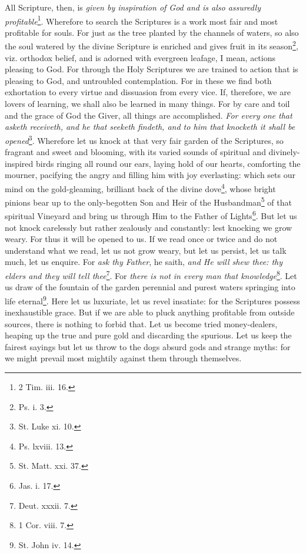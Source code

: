 All Scripture, then, is \emph{given by inspiration of God and is also assuredly profitable}\footnote{2 Tim. iii. 16.}. Wherefore to search the Scriptures is a work most fair and most profitable for souls. For just as the tree planted by the channels of waters, so also the soul watered by the divine Scripture is enriched and gives fruit in its season\footnote{Ps. i. 3.}, viz. orthodox belief, and is adorned with evergreen leafage, I mean, actions pleasing to God. For through the Holy Scriptures we are trained to action that is pleasing to God, and untroubled contemplation. For in these we find both exhortation to every virtue and dissuasion from every vice. If, therefore, we are lovers of learning, we shall also be learned in many things. For by care and toil and the grace of God the Giver, all things are accomplished. \emph{For every one that asketh receiveth, and he that seeketh findeth, and to him that knocketh it shall be opened}\footnote{St. Luke xi. 10.}. Wherefore let us knock at that very fair garden of the Scriptures, so fragrant and sweet and blooming, with its varied sounds of spiritual and divinely-inspired birds ringing all round our ears, laying hold of our hearts, comforting the mourner, pacifying the angry and filling him with joy everlasting: which sets our mind on the gold-gleaming, brilliant back of the divine dove\footnote{Ps. lxviii. 13.}, whose bright pinions bear up to the only-begotten Son and Heir of the Husbandman\footnote{St. Matt. xxi. 37.} of that spiritual Vineyard and bring us through Him to the Father of Lights\footnote{Jas. i. 17.}. But let us not knock carelessly but rather zealously and constantly: lest knocking we grow weary. For thus it will be opened to us. If we read once or twice and do not understand what we read, let us not grow weary, but let us persist, let us talk much, let us enquire. For \emph{ask thy Father}, he saith, \emph{and He will shew thee: thy elders and they will tell thee}\footnote{Deut. xxxii. 7.}. For \emph{there is not in every man that knowledge}\footnote{1 Cor. viii. 7.}. Let us draw of the fountain of the garden perennial and purest waters springing into life eternal\footnote{St. John iv. 14.}. Here let us luxuriate, let us revel insatiate: for the Scriptures possess inexhaustible grace. But if we are able to pluck anything profitable from outside sources, there is nothing to forbid that. Let us become tried money-dealers, heaping up the true and pure gold and discarding the spurious. Let us keep the fairest sayings but let us throw to the dogs absurd gods and strange myths: for we might prevail most mightily against them through themselves.

